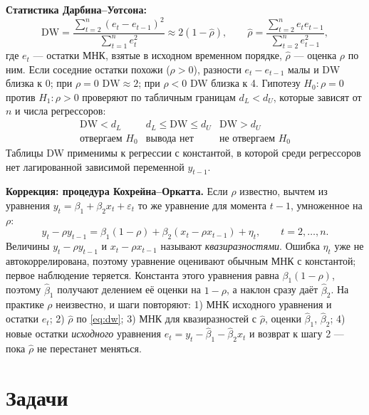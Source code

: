 \textbf{Статистика Дарбина--Уотсона:}
\begin{equation}
  \mathrm{DW} = \frac{\sum_{t=2}^{n}(e_t - e_{t-1})^2}{\sum_{t=1}^{n}e_t^2}
  \approx 2(1 - \widehat{\rho}),
  \qquad
  \widehat{\rho} = \frac{\sum_{t=2}^{n}e_te_{t-1}}{\sum_{t=2}^{n}e_{t-1}^2},
  \label{eq:dw}
\end{equation}
где $e_t$ — остатки МНК, взятые в исходном временном порядке, $\widehat\rho$
— оценка $\rho$ по ним. Если соседние остатки похожи ($\rho > 0$), разности
$e_t - e_{t-1}$ малы и DW близка к 0; при $\rho = 0$ $\mathrm{DW} \approx 2$;
при $\rho < 0$ DW близка к 4. Гипотезу $H_0\colon \rho = 0$ против
$H_1\colon \rho > 0$ проверяют по табличным границам $d_L < d_U$, которые
зависят от $n$ и числа регрессоров:
\[
\begin{array}{c|c|c}
\mathrm{DW}<d_L & d_L\leq\mathrm{DW}\leq d_U & \mathrm{DW}>d_U\\
\text{отвергаем }H_0 & \text{вывода нет} & \text{не отвергаем }H_0
\end{array}
\]
Таблицы DW применимы к регрессии с константой, в которой среди регрессоров нет
лагированной зависимой переменной $y_{t-1}$.

\textbf{Коррекция: процедура Кохрейна--Оркатта.} Если $\rho$ известно,
вычтем из уравнения $y_t = \beta_1 + \beta_2x_t + \varepsilon_t$ то же
уравнение для момента $t-1$, умноженное на $\rho$:
\begin{equation}
  y_t - \rho y_{t-1} = \beta_1(1 - \rho) + \beta_2(x_t - \rho x_{t-1}) + \eta_t,
  \qquad t = 2, \dots, n .
  \label{eq:co}
\end{equation}
Величины $y_t - \rho y_{t-1}$ и $x_t - \rho x_{t-1}$ называют
\emph{квазиразностями}. Ошибка $\eta_t$ уже не автокоррелирована, поэтому
уравнение оценивают обычным МНК с константой; первое наблюдение теряется.
Константа этого уравнения равна $\beta_1(1 - \rho)$, поэтому
$\widehat\beta_1$ получают делением её оценки на $1 - \rho$, а наклон сразу
даёт $\widehat\beta_2$. На практике $\rho$ неизвестно, и шаги повторяют:
1) МНК исходного уравнения и остатки $e_t$; 2) $\widehat\rho$ по \eqref{eq:dw};
3) МНК для квазиразностей с $\widehat\rho$, оценки $\widehat\beta_1$,
$\widehat\beta_2$; 4) новые остатки \emph{исходного} уравнения
$e_t = y_t - \widehat\beta_1 - \widehat\beta_2x_t$ и возврат к шагу 2 — пока
$\widehat\rho$ не перестанет меняться.
\fi

\ifsolutions\clearpage\fi
\section{Задачи}

